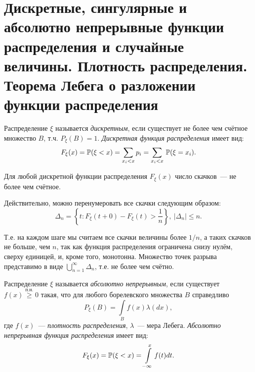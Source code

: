 \section{Дискретные, сингулярные и абсолютно непрерывные функции распределения и случайные величины. Плотность распределения. Теорема Лебега о разложении функции распределения}

\begin{defn}
    Распределение $\xi$ называется \textit{дискретным}, если существует не более чем счётное множество $B$, т.ч. $P_\xi(B) = 1$. 
    \textit{Дискретная функция распределения} имеет вид:
    \begin{equation*}
        F_\xi(x) = \operatorname{\mathbb{P}}(\xi < x) = \sum\limits_{x_i < x}{}p_{i} = \sum\limits_{x_i < x}{}\operatorname{\mathbb{P}}(\xi = x_{i}).
    \end{equation*}
\end{defn}

\begin{rmrk}
    Для любой дискретной функции распределения $F_\xi(x)$ число скачков~--- не более чем счётное.
    
    Действительно, можно перенумеровать все скачки следующим образом:
    \begin{equation*}
        \Delta_{n}=\left\{t \colon F_{\xi}(t+0)-F_{\xi}(t)>\frac{1}{n}\right\},~ |\Delta_{n} | \leqslant n.
    \end{equation*}
    
    Т.е. на каждом шаге мы считаем все скачки величины более $1 / n$, а таких скачков не больше, чем $n$, так как функция распределения ограничена снизу нулём, сверху единицей, и, кроме того, монотонна.
    Множество точек разрыва представимо в виде $\bigcup\limits_{n = 1}^{\infty} \Delta_{n}$, т.е. не более чем счётно.
\end{rmrk}

\begin{defn}
    Распределение $\xi$ называется \textit{абсолютно непрерывным}, если существует $f(x) \overset{\text{п.н.}}{\geqslant} 0$ такая, что для любого борелевского множества $B$ справедливо
    \begin{equation*}
        P_\xi(B) = \int\limits_B f(x) \lambda(dx),
    \end{equation*}
    где $f(x)$~--- \textit{плотность распределения}, $\lambda$~--- мера Лебега. 
    \textit{Абсолютно непрерывная функция распределения} имеет вид:
    \begin{equation*}
        F_\xi(x) = \operatorname{\mathbb{P}}(\xi < x) = \int\limits_{-\infty}^x f(t)dt.
    \end{equation*}
\end{defn}

